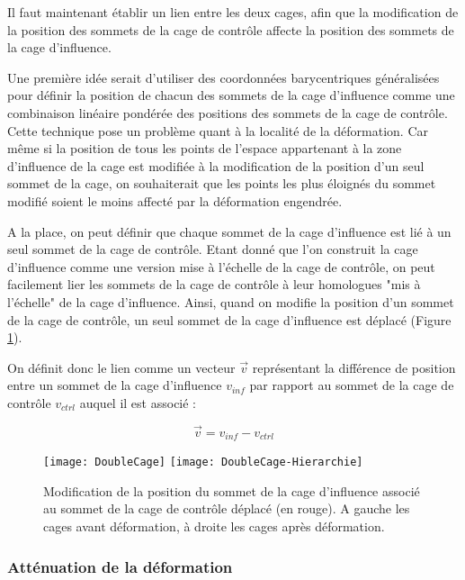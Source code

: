 Il faut maintenant établir un lien entre les deux cages, afin que la
modification de la position des sommets de la cage de contrôle affecte la
position des sommets de la cage d'influence.

Une première idée serait d'utiliser des coordonnées barycentriques
généralisées pour définir la position de chacun des sommets de la cage
d'influence comme une combinaison linéaire pondérée des positions des sommets
de la cage de contrôle. Cette technique pose un problème quant à la localité
de la déformation. Car même si  la position de tous les points de l'espace
appartenant à la zone d'influence de la cage est modifiée à la modification de
la position d'un seul sommet de la cage, on souhaiterait que les points les
plus éloignés du sommet modifié soient le moins affecté par la déformation
engendrée.

A la place, on peut définir que chaque sommet de la cage d'influence est lié à
un seul sommet de la cage de contrôle. Etant donné que l'on construit la cage
d'influence comme une version mise à l'échelle de la cage de contrôle, on peut
facilement lier les sommets de la cage de contrôle à leur homologues "mis à
l'échelle" de la cage d'influence. Ainsi, quand on modifie la position d'un
sommet de la cage de contrôle, un seul sommet de la cage d'influence est
déplacé (Figure \ref{MelHie}).

On définit donc le lien comme un vecteur $\overrightarrow{v}$ représentant la
différence de position entre un sommet de la cage d'influence $v_{inf}$ par
rapport au sommet de la cage de contrôle $v_{ctrl}$ auquel il est associé :

\begin{displaymath}
  \overrightarrow{v} = v_{inf}-v_{ctrl}
\end{displaymath}

\begin{figure}[ht]
\begin{center}
  \texttt{[image: DoubleCage]}
  \texttt{[image: DoubleCage-Hierarchie]}

  \caption{Modification de la position du sommet de la cage d'influence
associé au sommet de la cage de contrôle déplacé (en rouge). A gauche les
cages avant déformation, à droite les cages après déformation.}

  \label{MelHie}
\end{center}
\end{figure}

\subsubsection{Atténuation de la déformation}

